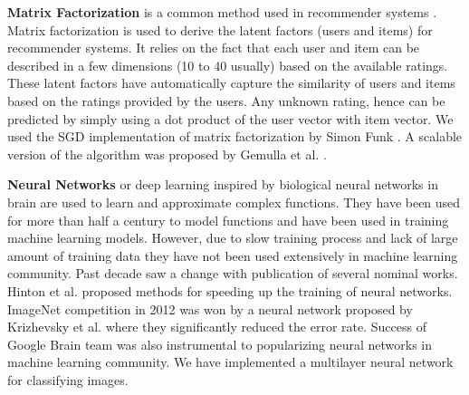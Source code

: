 \documentclass{vldb}
\begin{document}
\textbf{Matrix Factorization} is a common method used in recommender systems \cite{koren2009matrix}. 
Matrix factorization is used to derive the latent factors (users and items) for recommender systems.
It relies on the fact that each user and item can be described in a few dimensions (10 to 40 usually) based on the available ratings.
These latent factors have automatically capture the similarity of users and items based on the ratings provided by the users.
Any unknown rating, hence can be predicted by simply using a dot product of the user vector with item vector.
We used the SGD implementation of matrix factorization by Simon Funk \cite{funk2006netflix}. 
A scalable version of the algorithm was proposed by Gemulla et al. \cite{gemulla2011large}.

\textbf{Neural Networks} or deep learning inspired by biological neural networks in brain are used to learn and approximate complex functions. 
They have been used for more than half a century to model functions and have been used in training machine learning models.
However, due to slow training process and lack of large amount of training data they have not been used extensively in machine learning community.
Past decade saw a change with publication of several nominal works.
Hinton et al. \cite{hinton2006fast} proposed methods for speeding up the training of neural networks.
ImageNet competition \cite{ILSVRC15} in 2012 was won by a neural network proposed by Krizhevsky et al. \cite{krizhevsky2012imagenet} where they significantly reduced the error rate. 
Success of Google Brain team \cite{sutskever2014sequence, mikolov2013efficient} was also instrumental to popularizing neural networks in machine learning community.
We have implemented a multilayer neural network for classifying images.
\end{document}
